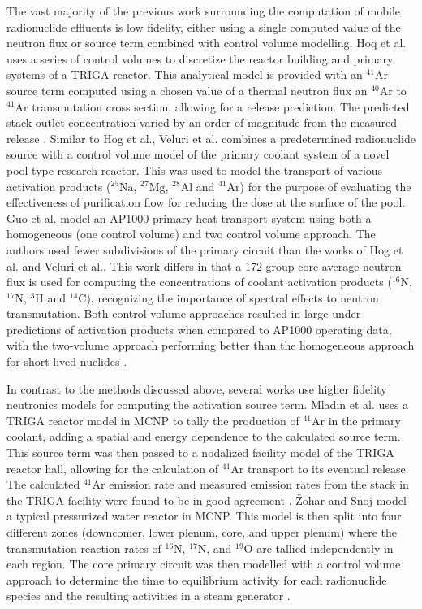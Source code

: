 The vast majority of the previous work surrounding the computation of mobile radionuclide effluents is low fidelity, either using a single computed value of the neutron flux or source term combined with control volume modelling. Hoq et al. \cite{ar41_triga_2} uses a series of control volumes to discretize the reactor building and primary systems of a TRIGA reactor. This analytical model is provided with an $\mathrm{^{41}Ar}$ source term computed using a chosen value of a thermal neutron flux an $\mathrm{^{40}Ar}$ to $\mathrm{^{41}Ar}$ transmutation cross section, allowing for a release prediction. The predicted stack outlet concentration varied by an order of magnitude from the measured release \cite{ar41_triga_2}. Similar to Hog et al., Veluri et al. \cite{ar41_etc_hfrr} combines a predetermined radionuclide source with a control volume model of the primary coolant system of a novel pool-type research reactor. This was used to model the transport of various activation products ($\mathrm{^{25}Na}$, $\mathrm{^{27}Mg}$, $\mathrm{^{28}Al}$ and $\mathrm{^{41}Ar}$) for the purpose of evaluating the effectiveness of purification flow for reducing the dose at the surface of the pool. Guo et al. \cite{activation_coolant_ap1000} model an AP1000 primary heat transport system using both a homogeneous (one control volume) and two control volume approach. The authors used fewer subdivisions of the primary circuit than the works of Hog et al. and Veluri et al.. This work differs in that a 172 group core average neutron flux is used for computing the concentrations of coolant activation products ($\mathrm{^{16}N}$, $\mathrm{^{17}N}$, $\mathrm{^{3}H}$ and $\mathrm{^{14}C}$), recognizing the importance of spectral effects to neutron transmutation. Both control volume approaches resulted in large under predictions of activation products when compared to AP1000 operating data, with the two-volume approach performing better than the homogeneous approach for short-lived nuclides \cite{activation_coolant_ap1000}.

In contrast to the methods discussed above, several works use higher fidelity neutronics models for computing the activation source term. Mladin et al. \cite{ar41_triga_1} uses a TRIGA reactor model in MCNP to tally the production of $\mathrm{^{41}Ar}$ in the primary coolant, adding a spatial and energy dependence to the calculated source term. This source term was then passed to a nodalized facility model of the TRIGA reactor hall, allowing for the calculation of $\mathrm{^{41}Ar}$ transport to its eventual release. The calculated $\mathrm{^{41}Ar}$ emission rate and measured emission rates from the stack in the TRIGA facility were found to be in good agreement \cite{ar41_triga_1}. Žohar and Snoj \cite{activation_coolant_fission_fusion} model a typical pressurized water reactor in MCNP. This model is then split into four different zones (downcomer, lower plenum, core, and upper plenum) where the transmutation reaction rates of $\mathrm{^{16}N}$, $\mathrm{^{17}N}$, and $\mathrm{^{19}O}$ are tallied independently in each region. The core primary circuit was then modelled with a control volume approach to determine the time to equilibrium activity for each radionuclide species and the resulting activities in a steam generator \cite{activation_coolant_fission_fusion}.

